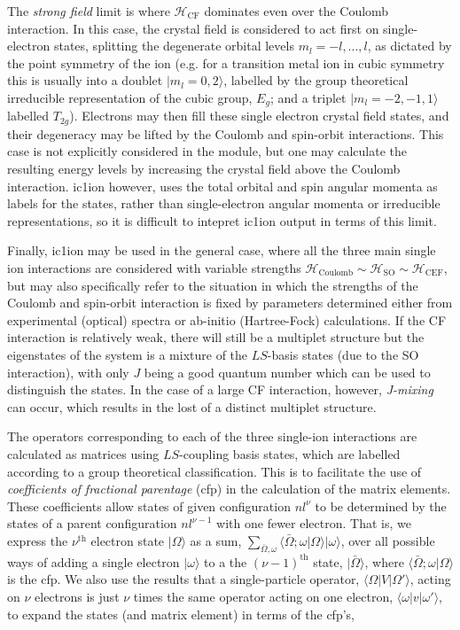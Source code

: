 The \emph{strong field} limit is where $\mathcal{H}_{\mathrm{CF}}$ dominates even over the Coulomb
interaction. In this case, the crystal field is considered to act first on single-electron states,
splitting the degenerate orbital levels $m_l=-l,...,l$, as dictated by the point symmetry of the
ion (e.g. for a transition metal ion in cubic symmetry this is usually into a doublet
$|m_l=0,2\rangle$, labelled by the group theoretical irreducible representation of the cubic group,
$E_g$; and a triplet $|m_l=-2,-1,1\rangle$ labelled $T_{2g}$). Electrons may then fill these single
electron crystal field states, and their degeneracy may be lifted by the Coulomb and spin-orbit
interactions. This case is not explicitly considered in the module, but one may calculate the
resulting energy levels by increasing the crystal field above the Coulomb interaction. {\prg
ic1ion} however, uses the total orbital and spin angular momenta as labels for the states, rather
than single-electron angular momenta or irreducible representations, so it is difficult to intepret
{\prg ic1ion} output in terms of this limit.

Finally, {\prg ic1ion} may be used in the general case, where all the three main
single ion interactions are considered with variable strengths
$\mathcal{H}_{\mathrm{Coulomb}}\sim
\mathcal{H}_{\mathrm{SO}}\sim
\mathcal{H}_{\mathrm{CEF}}$, but may also specifically refer to
the situation in which the strengths of the Coulomb and spin-orbit interaction is fixed by
parameters determined either from experimental (optical) spectra or ab-initio (Hartree-Fock)
calculations. If the CF interaction is relatively weak, there will still be a multiplet structure
but the eigenstates of the system is a mixture of the $LS$-basis states (due to the SO interaction),
with only $J$ being a good quantum number which can be used to distinguish the states. In the case
of a large CF interaction, however, \emph{J-mixing} can occur, which results in the lost of a
distinct multiplet structure.

The operators corresponding to each of the three single-ion interactions are calculated as matrices
using $LS$-coupling basis states, which are labelled according to a group theoretical
classification. This is to facilitate the use of \emph{coefficients of fractional parentage} (cfp)
in the calculation of the matrix elements. These coefficients allow states of given configuration
$nl^\nu$ to be determined by the states of a parent configuration $nl^{\nu-1}$ with one fewer electron.
That is, we express the $\nu^{\mathrm{th}}$ electron state $|\Omega\rangle$ as a sum,
$\sum_{\bar{\Omega},\omega} \langle\bar{\Omega};\omega|\Omega\rangle|\omega\rangle$, over all possible ways of
adding a single electron $|\omega\rangle$ to a the $(\nu-1)^{\mathrm{th}}$ state, $|\bar{\Omega}\rangle$,
where $\langle\bar{\Omega};\omega|\Omega\rangle$ is the cfp. We also use the results that a single-particle
operator, $\langle\Omega|V|\Omega'\rangle$, acting on $\nu$ electrons is just $\nu$ times the same operator 
acting on one electron, $\langle\omega|v|\omega'\rangle$, to expand the states (and matrix element) in
terms of the cfp's,

